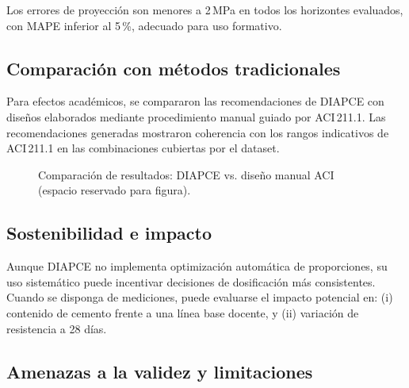 \documentclass[12pt, letterpaper]{article}
\begin{document}
Los errores de proyección son menores a 2\,MPa en todos los horizontes evaluados, con MAPE inferior al 5\,\%, adecuado para uso formativo.

\subsection{Comparación con métodos tradicionales}

Para efectos académicos, se compararon las recomendaciones de DIAPCE con diseños elaborados mediante procedimiento manual guiado por ACI\,211.1. Las recomendaciones generadas mostraron coherencia con los rangos indicativos de ACI\,211.1 en las combinaciones cubiertas por el dataset.

\begin{figure}[H]
  \centering
  \fbox{\rule{0pt}{2in}\rule{0.9\linewidth}{0pt}}
  \caption{Comparación de resultados: DIAPCE vs. diseño manual ACI (espacio reservado para figura).}
  \label{fig:comparacion-aci}
\end{figure}

\subsection{Sostenibilidad e impacto}

Aunque DIAPCE no implementa optimización automática de proporciones, su uso sistemático puede incentivar decisiones de dosificación más consistentes. Cuando se disponga de mediciones, puede evaluarse el impacto potencial en: (i) contenido de cemento frente a una línea base docente, y (ii) variación de resistencia a 28 días.

\subsection{Amenazas a la validez y limitaciones}
\end{document}
